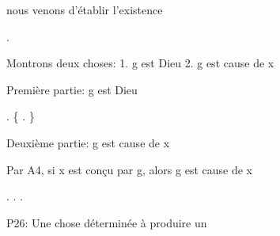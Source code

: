 \documentclass[10pt]{report}
\begin{document}
\begin{coqdoccode}
\begin{coqdoccomment}
nous\coqdocindent{0.50em}
venons\coqdocindent{0.50em}
d'établir\coqdocindent{0.50em}
l'existence\coqdocindent{0.50em}
\end{coqdoccomment}
\coqdoceol
\coqdocindent{1.00em}
\coqdoctac{\ensuremath{\exists}} .\coqdoceol
\coqdocemptyline
\coqdocindent{1.00em}
\begin{coqdoccomment}
\coqdocindent{0.50em}
Montrons\coqdocindent{0.50em}
deux\coqdocindent{0.50em}
choses:\coqdoceol
\coqdocindent{2.50em}
1.\coqdocindent{0.50em}
g\coqdocindent{0.50em}
est\coqdocindent{0.50em}
Dieu\coqdoceol
\coqdocindent{2.50em}
2.\coqdocindent{0.50em}
g\coqdocindent{0.50em}
est\coqdocindent{0.50em}
cause\coqdocindent{0.50em}
de\coqdocindent{0.50em}
x\coqdocindent{0.50em}
\end{coqdoccomment}
\coqdoceol
\coqdocemptyline
\coqdocindent{1.00em}
\begin{coqdoccomment}
\coqdocindent{0.50em}
Première\coqdocindent{0.50em}
partie:\coqdocindent{0.50em}
g\coqdocindent{0.50em}
est\coqdocindent{0.50em}
Dieu\coqdocindent{0.50em}
\end{coqdoccomment}
\coqdoceol
\coqdocindent{1.00em}
. \{  . \}\coqdoceol
\coqdocindent{1.00em}
\coqdoceol
\coqdocindent{1.00em}
\begin{coqdoccomment}
\coqdocindent{0.50em}
Deuxième\coqdocindent{0.50em}
partie:\coqdocindent{0.50em}
g\coqdocindent{0.50em}
est\coqdocindent{0.50em}
cause\coqdocindent{0.50em}
de\coqdocindent{0.50em}
x\coqdocindent{0.50em}
\end{coqdoccomment}
\coqdoceol
\coqdocindent{1.00em}
\begin{coqdoccomment}
\coqdocindent{0.50em}
Par\coqdocindent{0.50em}
A4,\coqdocindent{0.50em}
si\coqdocindent{0.50em}
x\coqdocindent{0.50em}
est\coqdocindent{0.50em}
conçu\coqdocindent{0.50em}
par\coqdocindent{0.50em}
g,\coqdocindent{0.50em}
alors\coqdocindent{0.50em}
g\coqdocindent{0.50em}
est\coqdocindent{0.50em}
cause\coqdocindent{0.50em}
de\coqdocindent{0.50em}
x\coqdocindent{0.50em}
\end{coqdoccomment}
\coqdoceol
\coqdocindent{1.00em}
 .  .\coqdoceol
\coqdocnoindent
{}.\coqdoceol
\coqdocemptyline
\coqdocnoindent
\begin{coqdoccomment}
\coqdocindent{0.50em}
P26:\coqdocindent{0.50em}
Une\coqdocindent{0.50em}
chose\coqdocindent{0.50em}
déterminée\coqdocindent{0.50em}
à\coqdocindent{0.50em}
produire\coqdocindent{0.50em}
un\coqdocindent{0.50em}

\end{coqdoccomment}
\end{coqdoccode}
\end{document}
